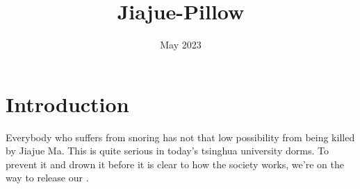\documentclass{article}
\title{Jiajue-Pillow}
\author{}
\date{May 2023}
\begin{document}
\maketitle

\section{Introduction}
Everybody who suffers from snoring has not that low possibility from being killed by Jiajue Ma. This is quite  serious in today's tsinghua university dorms. To prevent it and drown it before it is clear to how the society works, we're on the way to release our .
\end{document}
